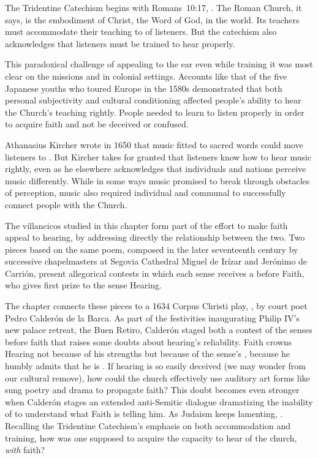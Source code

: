\documentclass{vcbook-proposal}
\begin{document}
The Tridentine Catechism begins with Romans~10:17, .
The Roman Church, it says, is the embodiment of Christ, the Word of God, in the world.
Its teachers must accommodate their teaching to  of listeners.
But the catechism also acknowledges that listeners must be trained to hear properly.

This paradoxical challenge of appealing to the ear even while training it was most clear on the missions and in colonial settings.
Accounts like that of the five Japanese youths who toured Europe in the 1580s demonstrated that both personal subjectivity and cultural conditioning affected people's ability to hear the Church's teaching rightly.
People needed to learn to listen properly in order to acquire faith and not be deceived or confused.

Athanasius Kircher wrote in 1650 that music fitted to sacred words could move listeners to .
But Kircher takes for granted that listeners know how to hear music rightly, even as he elsewhere acknowledges that individuals and nations perceive music differently.
While in some ways music promised to break through obstacles of perception, music also required individual and communal  to successfully connect people with the Church.

The villancicos studied in this chapter form part of the effort to make faith appeal to hearing, by addressing directly the relationship between the two.
Two pieces based on the same poem, composed in the later seventeenth century by successive chapelmasters at Segovia Cathedral Miguel de Irízar and Jerónimo de Carrión, present allegorical contests in which each sense receives a  before Faith, who gives first prize to the sense Hearing.

The chapter connects these pieces to a 1634 Corpus Christi play, , by court poet Pedro Calderón de la Barca.
As part of the festivities inaugurating Philip IV's new palace retreat, the Buen Retiro, Calderón staged both a contest of the senses before faith that raises some doubts about hearing's reliability.
Faith crowns Hearing not because of his strengths but because of the sense's , because he humbly admits that he is .
If hearing is so easily deceived (we may wonder from our cultural remove), how could the church effectively use auditory art forms like sung poetry and drama to propagate faith?
This doubt becomes even stronger when Calderón stages an extended anti-Semitic dialogue dramatizing the inability of  to understand what Faith is telling him.
As Judaism keeps lamenting, .
Recalling the Tridentine Catechism's emphasis on both accommodation and training, how was one supposed to acquire the capacity to hear  of the church, \emph{with} faith?
\end{document}
